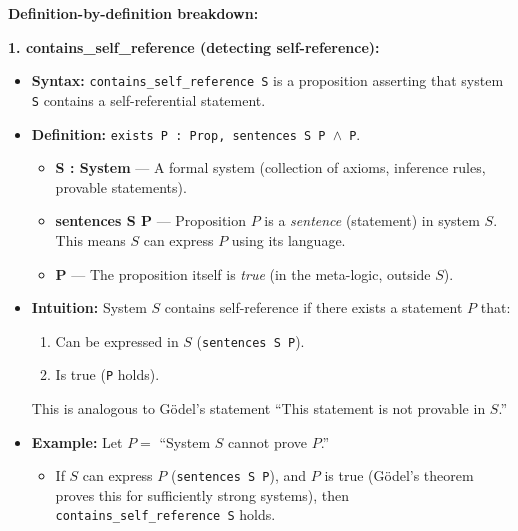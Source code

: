 \textbf{Definition-by-definition breakdown:}

\textbf{1. contains\_self\_reference (detecting self-reference):}
\begin{itemize}
    \item \textbf{Syntax:} \texttt{contains\_self\_reference S} is a proposition asserting that system \texttt{S} contains a self-referential statement.
    
    \item \textbf{Definition:} \texttt{exists P : Prop, sentences S P $\land$ P}.
    \begin{itemize}
        \item \textbf{S : System} — A formal system (collection of axioms, inference rules, provable statements).
        \item \textbf{sentences S P} — Proposition $P$ is a \textit{sentence} (statement) in system $S$. This means $S$ can express $P$ using its language.
        \item \textbf{P} — The proposition itself is \textit{true} (in the meta-logic, outside $S$).
    \end{itemize}
    
    \item \textbf{Intuition:} System $S$ contains self-reference if there exists a statement $P$ that:
    \begin{enumerate}
        \item Can be expressed in $S$ (\texttt{sentences S P}).
        \item Is true (\texttt{P} holds).
    \end{enumerate}
    This is analogous to Gödel's statement ``This statement is not provable in $S$.''
    
    \item \textbf{Example:} Let $P = $ ``System $S$ cannot prove $P$.''
    \begin{itemize}
        \item If $S$ can express $P$ (\texttt{sentences S P}), and $P$ is true (Gödel's theorem proves this for sufficiently strong systems), then \texttt{contains\_self\_reference S} holds.
    \end{itemize}
\end{itemize}

